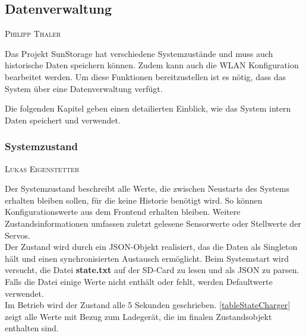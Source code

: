 \documentclass[12pt,a4paper,bibliography=totocnumbered,listof=totocnumbered]{article}
\makeatletter
\newcommand{\chapterauthor}[1]{%
  {\parindent0pt\vspace*{-5pt}%
  \linespread{1.1}\small\scshape#1%
  \par\nobreak\vspace*{3pt}}
  \@afterheading%
}
\makeatother
\begin{document}
\subsection{Datenverwaltung}
\chapterauthor{Philipp Thaler}
Das Projekt SunStorage hat verschiedene Systemzustände und muss auch historische Daten speichern können. Zudem kann auch die WLAN Konfiguration bearbeitet werden.
Um diese Funktionen bereitzustellen ist es nötig, dass das System über eine Datenverwaltung verfügt.

Die folgenden Kapitel geben einen detailierten Einblick, wie das System intern Daten speichert und verwendet.





\subsubsection{Systemzustand}\label{Systemzustand}
\chapterauthor{Lukas Eigenstetter}
Der Systemzustand beschreibt alle Werte, die zwischen Neustarts des Systems erhalten bleiben sollen, für die keine Historie benötigt wird.
So können Konfigurationswerte aus dem Frontend erhalten bleiben.
Weitere Zustandsinformationen umfassen zuletzt gelesene Sensorwerte oder Stellwerte der Servos.\\
Der Zustand wird durch ein JSON-Objekt realisiert, das die Daten als Singleton hält und einen synchronisierten Austausch ermöglicht.
Beim Systemstart wird versucht, die Datei \textbf{state.txt} auf der SD-Card zu lesen und als JSON zu parsen.
Falls die Datei einige Werte nicht enthält oder fehlt, werden Defaultwerte verwendet.\\
Im Betrieb wird der Zustand alle 5 Sekunden geschrieben.
\autoref{tableStateCharger} zeigt alle Werte mit Bezug zum Ladegerät, die im finalen Zustandsobjekt enthalten sind.\\
\end{document}

